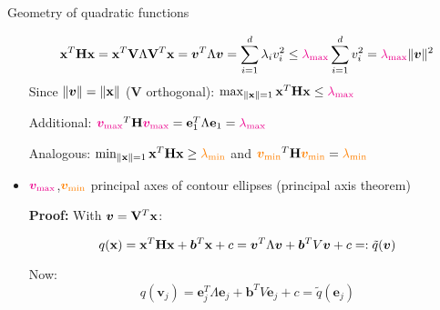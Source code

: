 \documentclass[11pt,compress,t,notes=noshow, xcolor=table]{beamer}
\begin{document}
\begin{vbframe}{Geometry of quadratic functions}
\begin{itemize}
\begin{footnotesize}
            \vspace{-\baselineskip}
            
            \begin{equation*}
                \mathbf{x}^T \mathbf{H} \mathbf{x} = \mathbf{x}^T\mathbf{V}\Lambda\mathbf{V}^T\mathbf{x} = \bm{v}^T\Lambda\bm{v} = \sum_{i=1}^d \lambda_iv_i^2 \leq \textcolor{magenta}{\lambda_\text{max}} \sum_{i=1}^d v_i^2 = \textcolor{magenta}{\lambda_\text{max}}\|\bm{v}\|^2
            \end{equation*}
            Since $\|\bm{v}\| = \|\mathbf{x}\|$ ($\mathbf{V}$ orthogonal): $\max_{\|\mathbf{x}\|=1} \mathbf{x}^T \mathbf{H} \mathbf{x} \leq \textcolor{magenta}{\lambda_\text{max}}$
            
            Additional: $\textcolor{magenta}{\bm{v}_\text{max}}^T \mathbf{H} \textcolor{magenta}{\bm{v}_\text{max}} = \mathbf{e}_1^T\Lambda\mathbf{e}_1 = \textcolor{magenta}{\lambda_\text{max}}$

            Analogous: $\min_{\|\mathbf{x}\|=1} \mathbf{x}^T \mathbf{H} \mathbf{x} \geq \textcolor{orange}{\lambda_\text{min}}$ and $\textcolor{orange}{\bm{v}_\text{min}}^T \mathbf{H} \textcolor{orange}{\bm{v}_\text{min}} = \textcolor{orange}{\lambda_\text{min}}$
        \end{footnotesize}

    \medskip

    \item $\textcolor{magenta}{\bm{v}_\text{max}}$,$\textcolor{orange}{\bm{v}_\text{min}}$ principal axes of contour ellipses (principal axis theorem)

        \vspace{0.25\baselineskip}
    
        \begin{footnotesize}
            \textbf{Proof:} With $\bm{v}=\mathbf{V}^T\mathbf{x}$:

            \vspace{-0.5\baselineskip}

            \begin{equation*}
                q(\mathbf{x}) = \mathbf{x}^T \mathbf{H} \mathbf{x} + \bm{b}^T\mathbf{x} + c = \bm{v}^T\Lambda\bm{v} + \bm{b}^T V \bm{v} + c =: \tilde{q}(\bm{v})
            \end{equation*}

            Now:
            \begin{equation*}
                q(\bm{v}_j) = \mathbf{e}_j^T\Lambda\mathbf{e}_j + \bm{b}^T V \mathbf{e}_j + c = \tilde{q}(\mathbf{e}_j)
            \end{equation*}


\end{footnotesize}
\end{itemize}
\end{vbframe}
\end{document}
